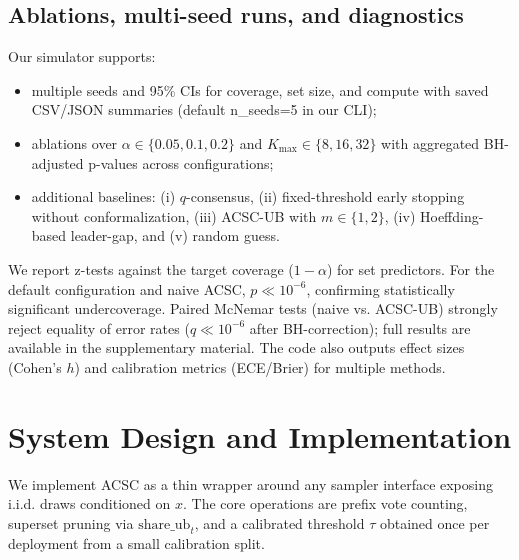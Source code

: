 \documentclass[11pt]{article}
\begin{document}
\subsection{Ablations, multi-seed runs, and diagnostics}
Our simulator supports:
\begin{itemize}
\item multiple seeds and 95\% CIs for coverage, set size, and compute with saved CSV/JSON summaries (default n\_seeds=5 in our CLI);
\item ablations over $\alpha\in\{0.05,0.1,0.2\}$ and $K_{\max}\in\{8,16,32\}$ with aggregated BH-adjusted p-values across configurations;
\item additional baselines: (i) $q$-consensus, (ii) fixed-threshold early stopping without conformalization, (iii) ACSC-UB with $m\in\{1,2\}$, (iv) Hoeffding-based leader-gap, and (v) random guess.
\end{itemize}
We report z-tests against the target coverage ($1-\alpha$) for set predictors. For the default configuration and naive ACSC, $p\ll 10^{-6}$, confirming statistically significant undercoverage. Paired McNemar tests (naive vs. ACSC-UB) strongly reject equality of error rates ($q \ll 10^{-6}$ after BH-correction); full results are available in the supplementary material. The code also outputs effect sizes (Cohen’s $h$) and calibration metrics (ECE/Brier) for multiple methods.

\section{System Design and Implementation}
We implement ACSC as a thin wrapper around any sampler interface exposing i.i.d. draws conditioned on $x$. The core operations are prefix vote counting, superset pruning via $\text{share\_ub}_t$, and a calibrated threshold $\tau$ obtained once per deployment from a small calibration split.
\end{document}
